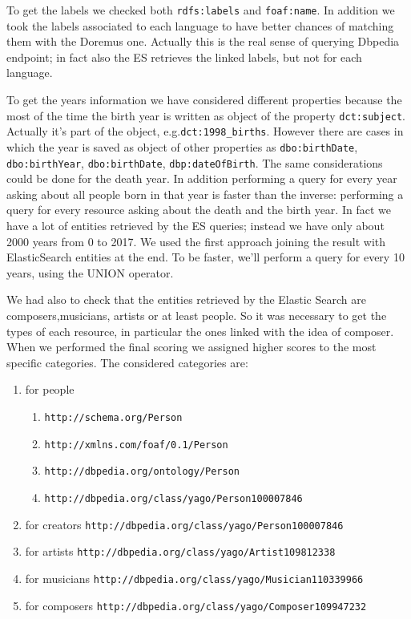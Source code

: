 \documentclass[paper=a4, fontsize=11pt]{scrartcl}
\begin{document}
To get the labels we checked both \verb|rdfs:labels| and \verb|foaf:name|. In addition we took the labels associated to each language to have better chances of matching them with the Doremus one. Actually this is the real sense of querying Dbpedia endpoint; in fact also the ES retrieves the linked labels, but not for each language.

To get the years information we have considered different properties because the most of the time the birth year is written as object of the property \verb|dct:subject|. Actually it's part of the object, e.g.\verb|dct:1998_births|. However there are cases in which the year is saved as object of other properties as \verb|dbo:birthDate|, \verb|dbo:birthYear|,
\verb|dbo:birthDate|, \verb|dbp:dateOfBirth|.
The same considerations could be done for the death year.
In addition performing a query for every year asking about all people born in that year is faster than the inverse: performing a query for every resource asking about the death and the birth year. In fact we have a lot of entities retrieved by the ES queries; instead we have only about 2000 years from 0 to 2017. We used the first approach joining the result with ElasticSearch entities at the end.
To be faster, we'll perform a query for every 10 years, using the UNION operator.

We had also to check that the entities retrieved by the Elastic Search are composers,musicians, artists or at least people. So it was necessary to get the types of each resource, in particular the ones linked with the idea of composer. When we performed the final scoring we assigned higher scores to the most specific categories.
The considered categories are:

\begin{enumerate}

\item for people \begin{enumerate} \item \verb|http://schema.org/Person| \item \verb|http://xmlns.com/foaf/0.1/Person|\item \verb|http://dbpedia.org/ontology/Person|\item \verb|http://dbpedia.org/class/yago/Person100007846| \end{enumerate}

\item for creators  \verb|http://dbpedia.org/class/yago/Person100007846|

\item for artists \verb|http://dbpedia.org/class/yago/Artist109812338|

\item for musicians \verb|http://dbpedia.org/class/yago/Musician110339966|

\item for composers \verb|http://dbpedia.org/class/yago/Composer109947232|
\end{enumerate}
\end{document}
